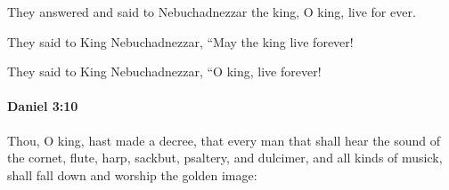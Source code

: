 			\begin{versebox}
					\item[BHS] 
					\item[LXX] 
					\item[ASV] They answered and said to Nebuchadnezzar the king, O king, live for ever.
					\item[NIV] They said to King Nebuchadnezzar, “May the king live forever!
					\item[NRSV] They said to King Nebuchadnezzar, “O king, live forever!
			\end{versebox}

		\paragraph{Daniel 3:10} %
			\label{DANIEL-3-10}

			Thou, O king, hast made a decree, that every man that shall hear the sound of the cornet, flute, harp, sackbut, psaltery, and dulcimer, and all kinds of musick, shall fall down and worship the golden image:

